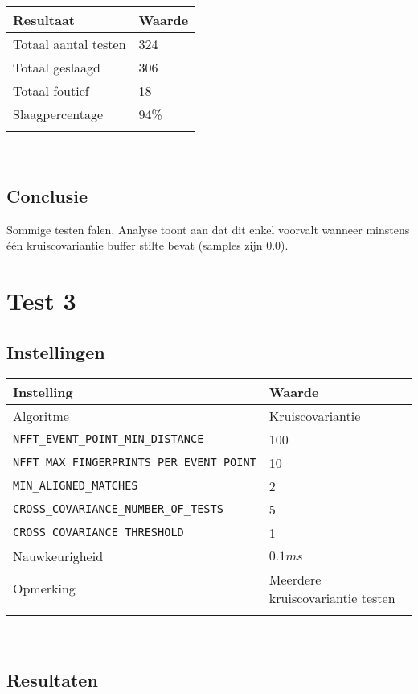 \begin{tabular}{ l  l}
	\hline
	\textbf{Resultaat} & \textbf{Waarde} \\
	\hline
	Totaal aantal testen & 324 \\
	Totaal geslaagd & 306 \\
	Totaal foutief & 18 \\
	Slaagpercentage & 94\% \\
	\\
\end{tabular}\\

\subsection*{Conclusie}

Sommige testen falen. Analyse toont aan dat dit enkel voorvalt wanneer minstens één kruiscovariantie buffer stilte bevat (samples zijn 0.0).

\section*{Test 3}

\subsection*{Instellingen}

\begin{tabular}{ l  l}
	\hline
	\textbf{Instelling} & \textbf{Waarde} \\
	\hline
	Algoritme & Kruiscovariantie \\
	\texttt{NFFT\_EVENT\_POINT\_MIN\_DISTANCE} & 100 \\
	\texttt{NFFT\_MAX\_FINGERPRINTS\_PER\_EVENT\_POINT} & 10 \\
	\texttt{MIN\_ALIGNED\_MATCHES} & 2 \\
	\texttt{CROSS\_COVARIANCE\_NUMBER\_OF\_TESTS} & 5 \\
	\texttt{CROSS\_COVARIANCE\_THRESHOLD} & 1 \\
	Nauwkeurigheid & $0.1ms$ \\
	Opmerking & Meerdere kruiscovariantie testen \\
	\\
\end{tabular}\\

\subsection*{Resultaten}

